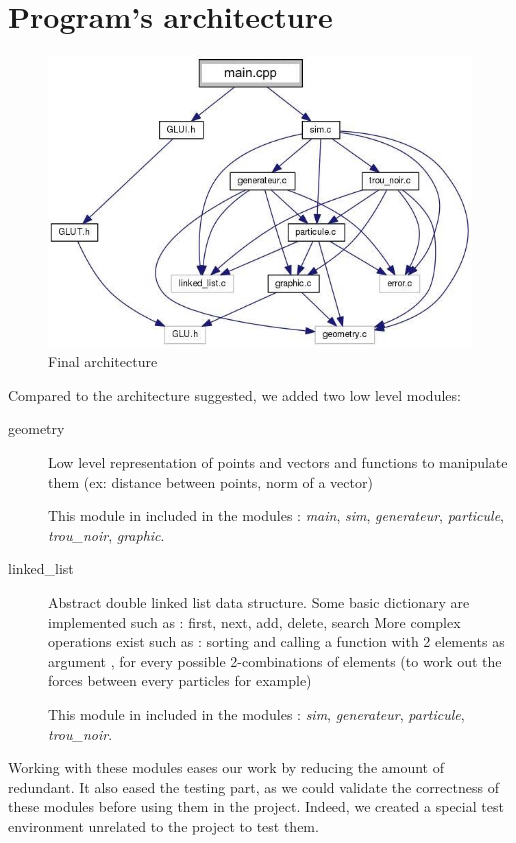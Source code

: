 \documentclass[a4paper]{report} %
\begin{document}
\section{Program's architecture}
\begin{figure}
\begin{center}
\includegraphics[scale=0.6]{architecture.jpg}
\end{center}
\caption{Final architecture}
\end{figure}

Compared to the architecture suggested, we added two low level modules:
\begin{description}
\item[geometry]
Low level representation of points and vectors and functions to manipulate them (ex: distance between points, norm of a vector)

This module in included in the modules : \emph{main}, \emph{sim}, \emph{generateur}, \emph{particule}, \emph{trou\_noir}, \emph{graphic}.
\item[linked\_list]
Abstract double linked list data structure.
Some basic dictionary are implemented such as : first, next, add, delete, search
More complex operations exist such as : sorting and calling a function with 2 elements as argument , for every possible 2-combinations of elements
(to work out the forces between every particles for example)

This module in included in the modules : \emph{sim}, \emph{generateur}, \emph{particule}, \emph{trou\_noir}.
\end{description}

Working with these modules eases our work by reducing the amount of redundant.
It also eased the testing part, as we could validate the correctness of these modules before using them in the project.
Indeed, we created a special test environment unrelated to the project to test them.
\end{document}
